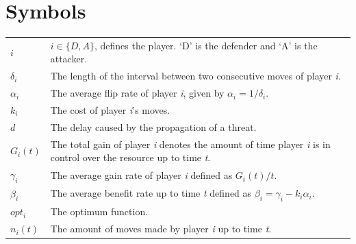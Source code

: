 \documentclass[master=cws, masteroption=vs]{kulemt}
\begin{document}
\section*{Symbols}
\begin{flushleft}
  \renewcommand{\arraystretch}{1.1}
  \begin{tabularx}{\textwidth}{@{}p{12mm}X@{}}
 $i$ & $i \in \{D,A\}$, defines the player. `D' is the defender and `A' is the attacker. \\
 $\delta_{i}$ & The length of the interval between two consecutive moves of player \textit{i}. \\
 $\alpha_{i}$ & The average flip rate of player \textit{i}, given by $\alpha_{i}=1/\delta_{i}$. \\
$k_{i}$ & The cost of player \textit{i}'s moves. \\
$d$ & The delay caused by the propagation of a threat. \\
 $G_{i}(t)$ & The total gain of player \textit{i} denotes the amount of time player \textit{i} is in control over the resource up to time \textit{t}. \\
$\gamma_{i}$ & The average gain rate of player \textit{i} defined as $G_{i}(t)/t$. \\
$\beta_{i}$ &  The average benefit rate up to time \textit{t} defined as  $\beta_{i} = \gamma_{i} -k_{i} \alpha_{i} $. \\
$opt_{i}$ & The optimum function. \\
$n_{i}(t)$ & The amount of moves made by player \textit{i} up to time \textit{t}. \\
  \end{tabularx}
\end{flushleft}

\mainmatter

%


%







%
%
%
%
%


%
%

\backmatter


\end{document}
